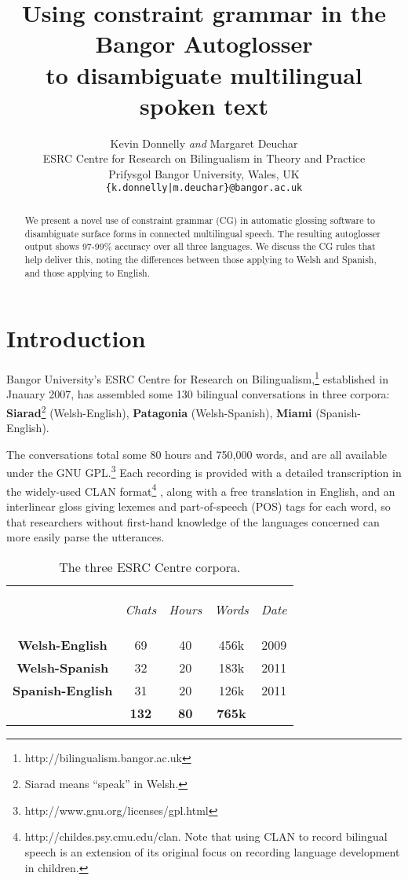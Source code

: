 \documentclass[11pt]{article}
\title{Using constraint grammar in the Bangor Autoglosser\\ to disambiguate multilingual spoken text}
\author{Kevin Donnelly \textit{and} Margaret Deuchar\\
  ESRC Centre for Research on Bilingualism in Theory and Practice\\
  Prifysgol Bangor University, Wales, UK\\
  {\tt \{k.donnelly|m.deuchar\}@bangor.ac.uk}  }
\date{}
\begin{document}
\maketitle
\begin{abstract}
We present a novel use of constraint grammar (CG) in automatic glossing software to disambiguate surface forms in connected multilingual speech.  The resulting autoglosser output shows 97-99\% accuracy over all three languages.  We discuss the CG rules that help deliver this, noting the differences between those applying to Welsh and Spanish, and those applying to English.
\end{abstract}

\smallskip
\section{Introduction}
\label{sec:intro}

Bangor University's ESRC Centre for Research on Bilingualism,\footnote{http://bilingualism.bangor.ac.uk} established in Jnauary 2007, has assembled some 130 bilingual conversations in three corpora: \textbf{Siarad}\footnote{Siarad means ``speak'' in Welsh.} (Welsh-English), \textbf{Patagonia} (Welsh-Spanish), \textbf{Miami} (Spanish-English).

The conversations total some 80 hours and 750,000 words, and are all available under the GNU GPL.\footnote{http://www.gnu.org/licenses/gpl.html}  Each recording is provided with a detailed transcription in the widely-used CLAN format\footnote{http://childes.psy.cmu.edu/clan.  Note that using CLAN to record bilingual speech is an extension of its original focus on recording language development in children.} \cite{macwhinney2000}, along with a free translation in English, and an interlinear gloss giving lexemes and part-of-speech (POS) tags for each word, so that researchers without first-hand knowledge of the languages concerned can more easily parse the utterances.

\begin{table}[!hbtp]
\centering
\begin{tabular}{ccccc}
& \begin{small}\textit{Chats}\end{small} & \begin{small}\textit{Hours}\end{small} & \begin{small}\textit{Words}\end{small} & \begin{small}\textit{Date}\end{small} \\
\cline{1-5}\noalign{\smallskip}
\textbf{Welsh-English} & 69 & 40 & 456k & 2009 \\
\textbf{Welsh-Spanish} & 32 & 20 & 183k & 2011 \\
\textbf{Spanish-English} & 31 & 20 & 126k & 2011 \\
\hline\noalign{\smallskip}
& \textbf{132} & \textbf{80} & \textbf{765k} \\
\end{tabular}
\caption{The three ESRC Centre corpora.}
\label{corpora}
\end{table}
\end{document}
